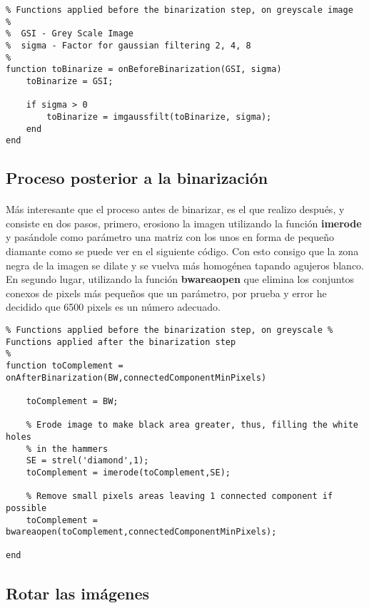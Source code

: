 \documentclass[es,gi]{ifirak}\usepackage[]{graphicx}\usepackage[]{color}
\begin{document}
\begin{lstlisting}
% Functions applied before the binarization step, on greyscale image
%  
%  GSI - Grey Scale Image
%  sigma - Factor for gaussian filtering 2, 4, 8
%
function toBinarize = onBeforeBinarization(GSI, sigma)
    toBinarize = GSI;
    
    if sigma > 0
        toBinarize = imgaussfilt(toBinarize, sigma);
    end
end
\end{lstlisting}

\subsection{Proceso posterior a la binarización}
\paragraph{}
Más interesante que el proceso antes de binarizar, es el que realizo después, y consiste en dos pasos, primero, erosiono la imagen utilizando la función \textbf{imerode} y pasándole como parámetro una matriz con los unos en forma de pequeño diamante como se puede ver en el siguiente código. Con esto consigo que la zona negra de la imagen se dilate y se vuelva más homogénea tapando agujeros blanco. En segundo lugar, utilizando la función \textbf{bwareaopen} que elimina los conjuntos conexos de pixels más pequeños que un parámetro, por prueba y error he decidido que 6500 pixels es un número adecuado.\\

\begin{lstlisting}
% Functions applied before the binarization step, on greyscale % Functions applied after the binarization step
%
function toComplement = onAfterBinarization(BW,connectedComponentMinPixels)

    toComplement = BW;
    
    % Erode image to make black area greater, thus, filling the white holes
    % in the hammers
    SE = strel('diamond',1);
    toComplement = imerode(toComplement,SE);

    % Remove small pixels areas leaving 1 connected component if possible
    toComplement = bwareaopen(toComplement,connectedComponentMinPixels);
    
end
\end{lstlisting}

\subsection{Rotar las imágenes}
\end{document}
